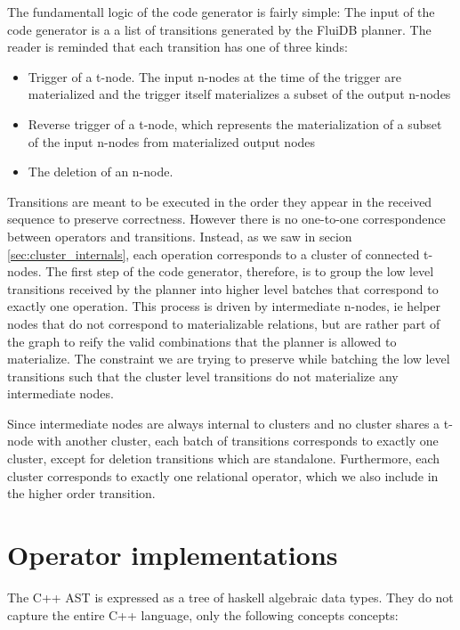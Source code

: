 The fundamentall logic of the code generator is fairly simple: The
input of the code generator is a a list of transitions generated by
the FluiDB planner. The reader is reminded that each transition has
one of three kinds:

\begin{itemize}
\item Trigger of a t-node. The input n-nodes at the time of the trigger
are materialized and the trigger itself materializes a subset of the
output n-nodes
\item Reverse trigger of a t-node, which represents the
materialization of a subset of the input n-nodes from materialized
output nodes
\item The deletion of an n-node.
\end{itemize}

Transitions are meant to be executed in the order they appear in the
received sequence to preserve correctness. However there is no
one-to-one correspondence between operators and transitions. Instead,
as we saw in secion \ref{sec:cluster_internals}, each operation
corresponds to a cluster of connected t-nodes. The first step of the
code generator, therefore, is to group the low level transitions
received by the planner into higher level batches that correspond to
exactly one operation. This process is driven by intermediate n-nodes,
ie helper nodes that do not correspond to materializable relations,
but are rather part of the graph to reify the valid combinations that
the planner is allowed to materialize. The constraint we are trying to
preserve while batching the low level transitions such that the
cluster level transitions do not materialize any intermediate nodes.

Since intermediate nodes are always internal to clusters and no
cluster shares a t-node with another cluster, each batch of
transitions corresponds to exactly one cluster, except for deletion
transitions which are standalone. Furthermore, each cluster
corresponds to exactly one relational operator, which we also include
in the higher order transition.

\section{Operator implementations}

The C++ AST is expressed as a tree of haskell algebraic data
types. They do not capture the entire C++ language, only the following
concepts concepts:

